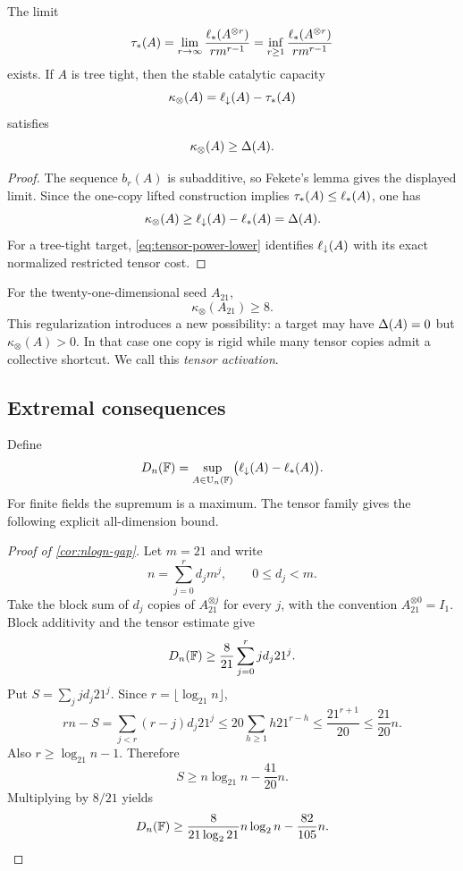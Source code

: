\begin{proposition}\label{prop:stable-tensor-length}
The limit
\[
\tau_*(A)
=
\lim_{r\to\infty}
\frac{\ell_{*}(A^{\otimes r})}{r m^{r-1}}
=
\inf_{r\ge1}
\frac{\ell_{*}(A^{\otimes r})}{r m^{r-1}}
\]
exists.  If $A$ is tree tight, then the stable catalytic capacity
\[
\kappa_\otimes(A)
=
\ell_{\downarrow}(A)-\tau_*(A)
\]
satisfies
\[
\kappa_\otimes(A)\ge\Delta(A).
\]
\end{proposition}

\begin{proof}
The sequence $b_r(A)$ is subadditive, so Fekete's lemma gives the displayed limit.  Since the one-copy lifted construction implies $\tau_*(A)\le\ell_{*}(A)$, one has
\[
\kappa_\otimes(A)
\ge
\ell_{\downarrow}(A)-\ell_{*}(A)
=
\Delta(A).
\]
For a tree-tight target, \cref{eq:tensor-power-lower} identifies $\ell_{\downarrow}(A)$ with its exact normalized restricted tensor cost.
\end{proof}

For the twenty-one-dimensional seed $A_{21}$,
\[
\kappa_\otimes(A_{21})\ge8.
\]
This regularization introduces a new possibility: a target may have $\Delta(A)=0$ but $\kappa_\otimes(A)>0$.  In that case one copy is rigid while many tensor copies admit a collective shortcut.  We call this \emph{tensor activation}.

\subsection{Extremal consequences}

Define
\[
D_n(\mathbb F)
=
\sup_{A\in\operatorname{U}_n(\mathbb F)}
\bigl(\ell_{\downarrow}(A)-\ell_{*}(A)\bigr).
\]
For finite fields the supremum is a maximum.  The tensor family gives the following explicit all-dimension bound.

\begin{proof}[Proof of \cref{cor:nlogn-gap}]
Let $m=21$ and write
\[
n=\sum_{j=0}^{r}d_jm^j,
\qquad
0\le d_j<m.
\]
Take the block sum of $d_j$ copies of $A_{21}^{\otimes j}$ for every $j$, with the convention $A_{21}^{\otimes0}=I_1$.  Block additivity and the tensor estimate give
\[
D_n(\mathbb F)
\ge
\frac{8}{21}
\sum_{j=0}^{r}j d_j21^j.
\]
Put $S=\sum_j j d_j21^j$.  Since $r=\lfloor\log_{21}n\rfloor$,
\[
r n-S
=
\sum_{j<r}(r-j)d_j21^j
\le
20\sum_{h\ge1}h21^{r-h}
\le
\frac{21^{r+1}}{20}
\le
\frac{21}{20}n.
\]
Also $r\ge\log_{21}n-1$.  Therefore
\[
S\ge n\log_{21}n-\frac{41}{20}n.
\]
Multiplying by $8/21$ yields
\[
D_n(\mathbb F)
\ge
\frac{8}{21\log_2 21}n\log_2n
-
\frac{82}{105}n.
\]
\end{proof}

